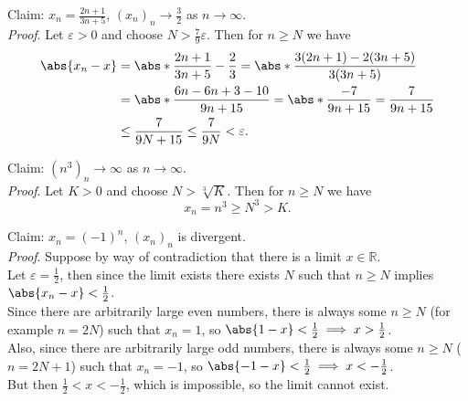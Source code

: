 \documentclass[../real_analysis.tex]{subfiles}
\begin{document}
            \begin{example}
                Claim: $x_n=\frac{2n+1}{3n+5}$, $(x_n)_n\to\frac{3}{2}$ as $n\to\infty$.\\
                \textit{Proof}. Let $\varepsilon>0$ and choose $N>\frac{7}{9}\varepsilon$. Then for $n\geq N$ we have
                \begin{align}
                    \abs{x_n-x}&=\abs*{\frac{2n+1}{3n+5}-\frac{2}{3}}=\abs*{\frac{3(2n+1)-2(3n+5)}{3(3n+5)}}\\
                    &=\abs*{\frac{6n-6n+3-10}{9n+15}}=\abs*{\frac{-7}{9n+15}}=\frac{7}{9n+15}\\
                    &\leq\frac{7}{9N+15}\leq\frac{7}{9N}<\varepsilon.
                \end{align}
            \end{example}
            \begin{example}
                Claim: $(n^3)_n\to\infty$ as $n\to\infty$.\\
                \textit{Proof}. Let $K>0$ and choose $N>\sqrt[3]{K}$. Then for $n\geq N$ we have
                \begin{equation}
                    x_n=n^3\geq N^3>K.
                \end{equation}
            \end{example}
            \begin{example}
                Claim: $x_n=(-1)^n$, $(x_n)_n$ is divergent.\\
                \textit{Proof}. Suppose by way of contradiction that there is a limit $x\in\mathbb{R}$.\\
                Let $\varepsilon=\frac{1}{2}$, then since the limit exists there exists $N$ such that $n\geq N$ implies $\abs{x_n-x}<\frac{1}{2}$.\\
                Since there are arbitrarily large even numbers, there is always some $n\geq N$ (for example $n=2N$) such that $x_n=1$, so $\abs{1-x}<\frac{1}{2}\implies x>\frac{1}{2}$.\\
                Also, since there are arbitrarily large odd numbers, there is always some $n\geq N$ ($n=2N+1$) such that $x_n=-1$, so $\abs{-1-x}<\frac{1}{2}\implies x<-\frac{1}{2}$.\\
                But then $\frac{1}{2}<x<-\frac{1}{2}$, which is impossible, so the limit cannot exist.
            \end{example}
\end{document}
